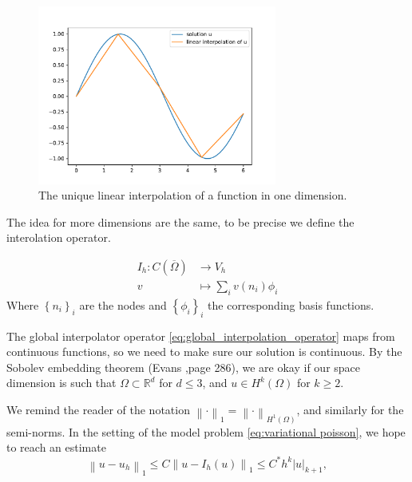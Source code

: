 \documentclass[../Main/main.tex]{subfiles}
\begin{document}
	\begin{figure}[H]
		\centering
		\includegraphics[width=0.7\textwidth]{interpolation.pdf}
		\caption{The unique linear interpolation of a function in one dimension.}
		\label{fig:1dinterpolation}
	\end{figure}
	The idea for more dimensions are the same, to be precise we define the interolation operator.
	\begin{definition}		\label{def:global_interpolator}
		\begin{equation}\label{eq:global_interpolation_operator}
		\begin{aligned}
			I_h: C(\overline{\Omega})& \rightarrow V_h \\
			v& \mapsto \sum_{i}v(n_i) \phi_i
		\end{aligned} 
		\end{equation}
	Where $\left\{ n_i\right \}_i$ are the nodes and $\left\{ \phi_i\right \}_i$ the corresponding basis functions.

	\end{definition}
	\begin{remark}
		The global interpolator operator \eqref{eq:global_interpolation_operator} maps from continuous functions, so we need to make sure our solution is continuous. By the Sobolev embedding theorem (Evans \cite{evans10},page 286), we are okay if our space dimension is such that $\Omega \subset \mathbb{R}^d$ for $d\leq3$, and $u \in H^k(\Omega)$ for $k\geq 2$.
	\end{remark}
	We remind the reader of the notation $\left \|\cdot \right\|_1 = \left \|\cdot \right\|_{H^1(\Omega)}$, and similarly for the semi-norms.
	In the setting of the model problem \eqref{eq:variational poisson}, we hope to reach an estimate
	\begin{equation}\label{eq:energy norm estimate}
		\left \| u-u_h \right \|_{1} \leq C \left \| u-I_h(u) \right \|_{1}\leq C^* h^{k}|u|_{k+1},
	\end{equation}
\end{document}
